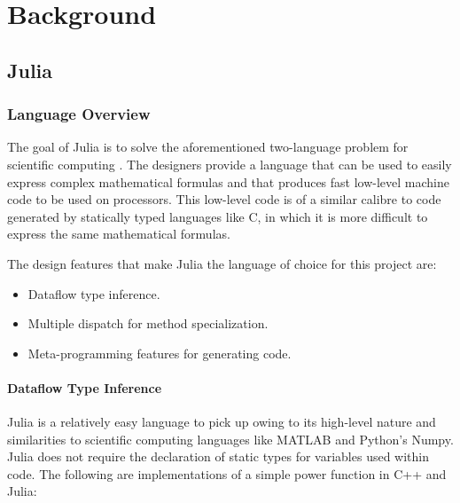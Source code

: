 \chapter{Background}
\section{Julia}

\subsection{Language Overview}
The goal of Julia is to solve the aforementioned two-language problem for scientific computing \cite{julia_intro}. The designers provide a language that can be used to easily express complex mathematical formulas and that produces fast low-level machine code to be used on processors. This low-level code is of a similar calibre to code generated by statically typed languages like C, in which it is more difficult to express the same mathematical formulas.

The design features that make Julia the language of choice for this project are:

\begin{itemize}
    \item Dataflow type inference.
    \item Multiple dispatch for method specialization.
    \item Meta-programming features for generating code.
\end{itemize}

\pagebreak

\subsubsection{Dataflow Type Inference}
Julia is a relatively easy language to pick up owing to its high-level nature and similarities to scientific computing languages like MATLAB and Python's Numpy. Julia does not require the declaration of static types for variables used within code. The following are implementations of a simple power function in C++ and Julia:



